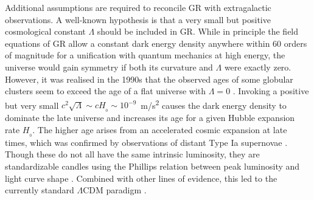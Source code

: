 \documentclass[fleqn,usenatbib,useAMS]{mnras} %
\begin{document}
Additional assumptions are required to reconcile GR with extragalactic observations. A well-known hypothesis is that a very small but positive cosmological constant $\Lambda$ should be included in GR. While in principle the field equations of GR allow a constant dark energy density anywhere within $60$ orders of magnitude for a unification with quantum mechanics at high energy, the universe would gain symmetry if both its curvature and $\Lambda$ were exactly zero. However, it was realised in the 1990s that the observed ages of some globular clusters seem to exceed the age of a flat universe with $\Lambda = 0$ \citep{Bolte_1995, Jimenez_1996}. Invoking a positive but very small $c^2\sqrt{\Lambda} \sim c H_{_0} \sim 10^{-9}$~m/s\textsuperscript{2} causes the dark energy density to dominate the late universe and increases its age for a given Hubble expansion rate $H_{_0}$. The higher age arises from an accelerated cosmic expansion at late times, which was confirmed by observations of distant Type Ia supernovae \citep{Riess_1998, Perlmutter_1999}. Though these do not all have the same intrinsic luminosity, they are standardizable candles using the Phillips relation between peak luminosity and light curve shape \citep{Phillips_1993, Phillips_1999}. Combined with other lines of evidence, this led to the currently standard $\Lambda$CDM paradigm \citep{Efstathiou_1990, Ostriker_Steinhardt_1995}.
\end{document}
